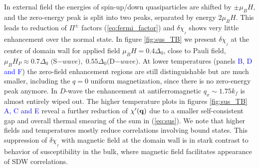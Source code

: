 \documentclass[prb,aps,showpacs,amsmath,twocolumn,10pt]{revtex4-1}
\newcommand{\blue}{\textcolor{blue}}
\newcommand{\red}{\textcolor{red}}
\begin{document}
In external field the energies of spin-up/down quasiparticles are shifted by $\pm \mu_B H$, 
and the zero-energy peak is split into two peaks, separated by energy $2\mu_B H$. This leads to 
reduction of $\Pi^{\pm}$ factors (\ref{eq:fermi_factor}) 
and $\delta\chi_{{}_I}$ shows very little enhancement over the normal state. 
In figure \ref{fig:sus_TB} we present $\delta\chi_{{}_I}$ at the center of domain wall for applied field
$\mu_B H = 0.4\Delta_0$, close to Pauli field, $\mu_B H_P \approx 0.7 \Delta_0\; ($S$-wave),\; 0.55\Delta_0 ($D$-wave)$. 
At lower temperatures (panels \blue{B, D and F}) the zero-field enhancement regions %
are still distinguishable but are much smaller, including the $q=0$ uniform magnetization, since there is no 
zero-energy peak anymore. In $D$-wave the enhancement at antiferromagnetic $q_x \sim 1.75 k_f$ is 
almost entirely wiped out. 
The higher temperature plots in figures \blue{\ref{fig:sus_TB} A, C and E}
reveal a further reduction of $\chi'({\bf q})$ due to a smaller self-consistent gap
and overall thermal smearing of the sum in (\ref{eq:sus}).   
We note that higher fields and temperatures mostly reduce correlations involving bound states. 
%
This suppression of $\delta\chi_{{}_I}$ with magnetic field at the domain wall is in stark contrast %
to behavior of susceptibility in the bulk, where magnetic field facilitates appearance of SDW 
correlations.\cite{Ikeda:2010eo,sc_afm_kato,Rosemeyer2014} 
\end{document}
